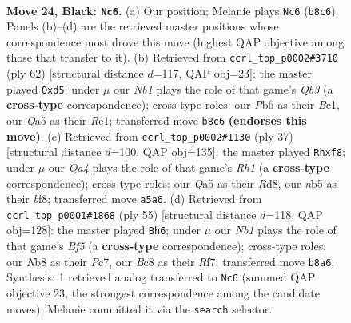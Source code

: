 \documentclass[11pt]{article}
\begin{document}
\clearpage

\begin{figure}[p]\centering
\begin{subfigure}{0.46\textwidth}\centering
\resizebox{\linewidth}{!}{%
\newchessgame
\chessboard[
  setfen={rnb3k1/P3rp2/1p3np1/qN1p2Np/P2P1P1P/R2B2P1/5K2/3Q3R b - - 0 24},
  showmover=false,
  pgfstyle=straightmove, color=movearrow, markmove={b8-c6}
]}
\caption{}
\end{subfigure}\hfill
\begin{subfigure}{0.46\textwidth}\centering
\resizebox{\linewidth}{!}{%
\newchessgame
\chessboard[
  setfen={3brr1k/1p4p1/p2p1n1p/P1pq4/R3pPP1/1QP4P/1P4N1/2B1R1K1 w - - 1 32},
  showmover=false,
  pgfstyle=straightmove, color=movearrow, markmove={b3-d5}
]}
\caption{}
\end{subfigure}
\\[4pt]
\begin{subfigure}{0.46\textwidth}\centering
\resizebox{\linewidth}{!}{%
\newchessgame
\chessboard[
  setfen={k2r1B1r/1pp4p/p1n1bp2/4p3/qPN1P1p1/1N1P4/P3QPPP/R1R3K1 b - - 0 19},
  showmover=false,
  pgfstyle=straightmove, color=movearrow, markmove={h8-f8}
]}
\caption{}
\end{subfigure}\hfill
\begin{subfigure}{0.46\textwidth}\centering
\resizebox{\linewidth}{!}{%
\newchessgame
\chessboard[
  setfen={7k/2pq1r2/1p1p2p1/rN1Ppn1p/P1P1Nb2/R5PP/5P2/3QR1K1 b - - 0 28},
  showmover=false,
  pgfstyle=straightmove, color=movearrow, markmove={f4-h6}
]}
\caption{}
\end{subfigure}
\caption{\textbf{Move 24, Black: \texttt{Nc6}.} (a) Our position; Melanie plays \texttt{Nc6} (\texttt{b8c6}). Panels (b)--(d) are the retrieved master positions whose correspondence most drove this move (highest QAP objective among those that transfer to it). (b) Retrieved from \texttt{ccrl\_top\_p0002\#3710} (ply 62) [structural distance $d$=117, QAP obj=23]: the master played \texttt{Qxd5}; under $\mu$ our \emph{Nb1} plays the role of that game's \emph{Qb3} (a \textbf{cross-type} correspondence); cross-type roles: our \emph{P}b6 as their \emph{B}c1, our \emph{Q}a5 as their \emph{R}e1; transferred move \texttt{b8c6} \textbf{(endorses this move)}. (c) Retrieved from \texttt{ccrl\_top\_p0002\#1130} (ply 37) [structural distance $d$=100, QAP obj=135]: the master played \texttt{Rhxf8}; under $\mu$ our \emph{Qa4} plays the role of that game's \emph{Rh1} (a \textbf{cross-type} correspondence); cross-type roles: our \emph{Q}a5 as their \emph{R}d8, our \emph{n}b5 as their \emph{b}f8; transferred move \texttt{a5a6}. (d) Retrieved from \texttt{ccrl\_top\_p0001\#1868} (ply 55) [structural distance $d$=118, QAP obj=128]: the master played \texttt{Bh6}; under $\mu$ our \emph{Nb1} plays the role of that game's \emph{Bf5} (a \textbf{cross-type} correspondence); cross-type roles: our \emph{N}b8 as their \emph{P}c7, our \emph{B}c8 as their \emph{R}f7; transferred move \texttt{b8a6}. Synthesis: 1 retrieved analog transferred to \texttt{Nc6} (summed QAP objective 23, the strongest correspondence among the candidate moves); Melanie committed it via the \texttt{search} selector.}
\label{fig:thought-m47}
\end{figure}
\end{document}
